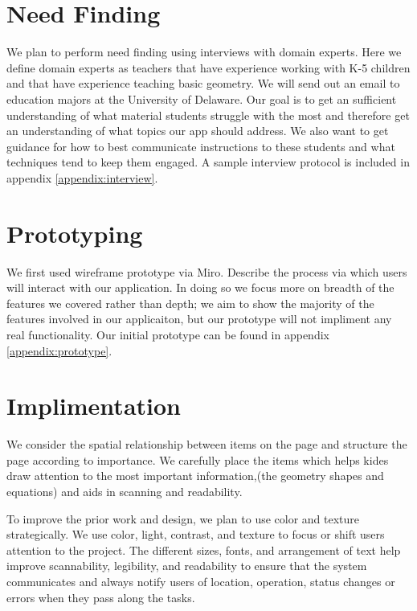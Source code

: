 \documentclass[manuscript, nonacm]{acmart}
\begin{document}
\section{Need Finding}

We plan to perform need finding using interviews with domain experts.  Here we
define domain experts as teachers that have experience working with K-5 children
and that have experience teaching basic geometry. We will send out an email to
education majors at the University of Delaware. Our goal is to get an sufficient
understanding of what material students struggle with the most and therefore get
an understanding of what topics our app should address. We also want to get
guidance for how to best communicate instructions to these students and what
techniques tend to keep them engaged. A sample interview protocol is included in
appendix \ref{appendix:interview}.

\section{Prototyping}

We first used wireframe prototype via Miro. Describe the process via which users
will interact with our application.  In doing so we focus more on breadth of the
features we covered rather than depth; we aim to show the majority of the
features involved in our applicaiton, but our prototype will not impliment any
real functionality. Our initial prototype can be found in appendix \ref{appendix:prototype}.

\section{Implimentation}

We consider the spatial relationship between items on the page and structure the
page according to importance. We carefully place the items which helps kides
draw attention to the most important information,(the geometry shapes and
equations) and aids in scanning and readability.

To improve the prior work and design, we plan to use color and texture
strategically. We use color, light, contrast, and texture to focus or shift
users attention to the project. The different sizes, fonts, and arrangement of
text help improve scannability, legibility, and readability to ensure that the
system communicates and always notify users of location, operation, status
changes or errors when they pass along the tasks.
\end{document}
